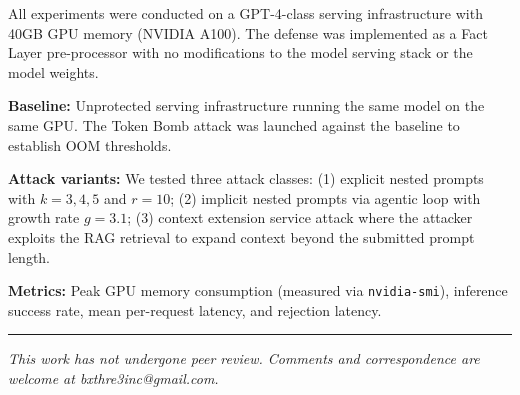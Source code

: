 \documentclass[12pt]{article}
\begin{document}
All experiments were conducted on a GPT-4-class serving infrastructure with 40GB GPU memory (NVIDIA A100). The defense was implemented as a Fact Layer pre-processor with no modifications to the model serving stack or the model weights.

\textbf{Baseline:} Unprotected serving infrastructure running the same model on the same GPU. The Token Bomb attack was launched against the baseline to establish OOM thresholds.

\textbf{Attack variants:} We tested three attack classes: (1) explicit nested prompts with $k=3,4,5$ and $r=10$; (2) implicit nested prompts via agentic loop with growth rate $g=3.1$; (3) context extension service attack where the attacker exploits the RAG retrieval to expand context beyond the submitted prompt length.

\textbf{Metrics:} Peak GPU memory consumption (measured via \texttt{nvidia-smi}), inference success rate, mean per-request latency, and rejection latency.





\vspace{2em}
\hrule
\vspace{0.5em}
\noindent\small\textit{This work has not undergone peer review. Comments and correspondence are welcome at bxthre3inc@gmail.com.}
\end{document}
